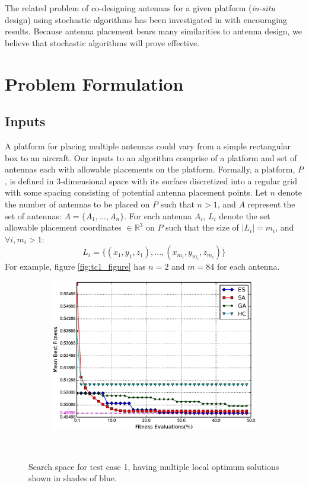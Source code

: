 \documentclass[conference]{IEEEtran}
\begin{document}
The related problem of co-designing antennas for a given platform ({\em in-situ} design) using stochastic algorithms has been investigated in \cite{linden2000wire} with encouraging results. Because antenna placement bears many similarities to antenna design, we believe that stochastic algorithms will prove effective.

\section{Problem Formulation}
\label{sec:problem}
\subsection{Inputs}
\label{sec:inputs}
A platform for placing multiple antennas could vary from a simple rectangular box to an aircraft. Our inputs to an algorithm comprise of a platform and set of antennas each with allowable placements on the platform. Formally, a platform, $P$, is defined in 3-dimensional space with its surface discretized into a regular grid with some spacing consisting of potential antenna placement points. Let $n$ denote the number of antennas to be placed on $P$ such that $n>1$, and $A$ represent the set of antennas: $A = \{A_1, ..., A_n\}$. For each antenna $A_i$, $L_i$ denote the set allowable placement coordinates $\in \mathbb R^3$ on $P$ such that the size of $\mid L_i \mid =m_i$, and $ \forall i, m_i>1$:
\[
L_i = \{(x_{1}, y_{1}, z_{1}), ..., (x_{m_i}, y_{m_i}, z_{m_i})\}
\]
For example, figure \ref{fig:tc1_figure} has $n=2$ and $m=84$ for each antenna.
\begin{figure}%
    \begin{subfigure}{\columnwidth}
        \includegraphics[width=\columnwidth]{FIG/tc2_mf}%
    \end{subfigure}\hfill\\
    \caption{Search space for test case 1, having multiple local optimum solutions shown in shades of blue.}%
    \label{fig:tc1_ss}%
\end{figure}
\end{document}
